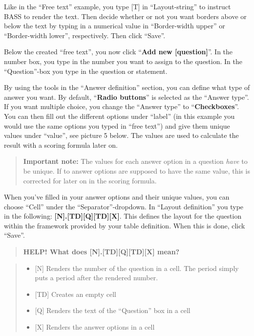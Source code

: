 \documentclass[]{book}
\providecommand{\tightlist}{%
  \setlength{\itemsep}{0pt}\setlength{\parskip}{0pt}}
\begin{document}
Like in the ``Free text'' example, you type {[}T{]} in ``Layout-string'' to instruct BASS to render the text. Then decide whether or not you want borders above or below the text by typing in a numerical value in ``Border-width upper'' or ``Border-width lower'', respectively. Then click ``Save''.

Below the created ``free text'', you now click ``\textbf{Add new {[}question{]}}''. In the number box, you type in the number you want to assign to the question. In the ``Question''-box you type in the question or statement.

By using the tools in the ``Answer definition'' section, you can define what type of answer you want. By default, ``\textbf{Radio buttons}'' is selected as the ``Answer type''. If you want multiple choice, you change the ``Answer type'' to ``\textbf{Checkboxes}''.
You can then fill out the different options under ``label'' (in this example you would use the same options you typed in ``free text'') and give them unique values under ``value'', see picture 5 below. The values are used to calculate the result with a scoring formula later on.

\begin{quote}
\textbf{Important note:} The values for each answer option in a question \emph{have} to be unique. If to answer options are supposed to have the same value, this is corrected for later on in the scoring formula.
\end{quote}

When you've filled in your answer options and their unique values, you can choose ``Cell'' under the ``Separator''-dropdown. In ``Layout definition'' you type in the following: \textbf{{[}N{]}.{[}TD{]}{[}Q{]}{[}TD{]}{[}X{]}}. This defines the layout for the question within the framework provided by your table definition. When this is done, click ``Save''.

\begin{quote}
\textbf{HELP! What does {[}N{]}.{[}TD{]}{[}Q{]}{[}TD{]}{[}X{]} mean?}
\end{quote}

\begin{quote}
\begin{itemize}
\tightlist
\item
  {[}N{]} Renders the number of the question in a cell. The period simply puts a period after the rendered number.
\item
  {[}TD{]} Creates an empty cell
\item
  {[}Q{]} Renders the text of the ``Question'' box in a cell
\item
  {[}X{]} Renders the answer options in a cell
\end{itemize}
\end{quote}
\end{document}
